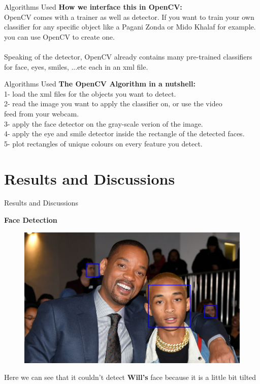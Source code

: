 \documentclass[10pt]{beamer}
\newcommand\tab[1][0.5cm]{\hspace*{#1}}
\begin{document}
\begin{frame}{Algorithms Used}
\textbf{How we interface this in OpenCV:} \\
\tab OpenCV comes with a trainer as well as detector. If you want to train your own classifier for any specific object like a Pagani Zonda or Mido Khalaf for example. you can use OpenCV to create one. \\~\\

Speaking of the detector, OpenCV already contains many pre-trained classifiers for face, eyes, smiles, ...etc each in an xml file. \\
\end{frame}


\begin{frame}{Algorithms Used}
\textbf{The OpenCV Algorithm in a nutshell:} \\
\tab 1- load the xml files for the objects you want to detect. \\
\tab 2- read the image you want to apply the classifier on, or use the video \\
\tab[0.8cm] feed from your webcam. \\
\tab 3- apply the face detector on the gray-scale verion of the image. \\
\tab 4- apply the eye and smile detector inside the rectangle of the
\tab[0.8cm] detected faces. \\
\tab 5- plot rectangles of unique colours on every feature you detect.
\end{frame}


\section{Results and Discussions}
\begin{frame}{Results and Discussions}

\centering
\textbf{Face Detection}

\begin{figure}
\vspace*{0cm}
\hspace*{0cm}
\includegraphics[scale=0.25]{samples/face}
\end{figure}

\small Here we can see that it couldn't detect \textbf{Will's} face because it is a little bit tilted
\end{frame}
\end{document}
